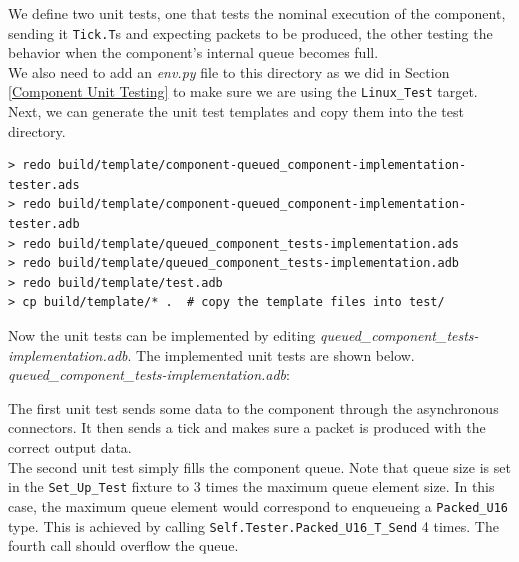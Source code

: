 
We define two unit tests, one that tests the nominal execution of the component, sending it \texttt{Tick.T}s and expecting packets to be produced, the other testing the behavior when the component's internal queue becomes full. \\

We also need to add an \textit{env.py} file to this directory as we did in Section \ref{Component Unit Testing} to make sure we are using the \texttt{Linux\_Test} target. \\

Next, we can generate the unit test templates and copy them into the test directory.

\vspace{5mm} %
\begin{verbatim}
> redo build/template/component-queued_component-implementation-tester.ads
> redo build/template/component-queued_component-implementation-tester.adb
> redo build/template/queued_component_tests-implementation.ads
> redo build/template/queued_component_tests-implementation.adb
> redo build/template/test.adb
> cp build/template/* .  # copy the template files into test/
\end{verbatim}
\vspace{5mm} %

Now the unit tests can be implemented by editing \textit{queued\_component\_tests-implementation.adb}. The implemented unit tests are shown below. \\

\textit{queued\_component\_tests-implementation.adb}:

The first unit test sends some data to the component through the asynchronous connectors. It then sends a tick and makes sure a packet is produced with the correct output data. \\

The second unit test simply fills the component queue. Note that queue size is set in the \texttt{Set\_Up\_Test} fixture to 3 times the maximum queue element size. In this case, the maximum queue element would correspond to enqueueing a \texttt{Packed\_U16} type. This is achieved by calling \texttt{Self.Tester.Packed\_U16\_T\_Send} 4 times. The fourth call should overflow the queue. \\

